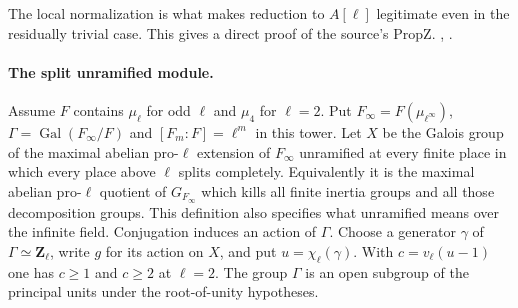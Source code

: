 The local normalization is what makes reduction to \(A[\ell]\)
legitimate even in the residually trivial case. This gives a direct
proof of the source's \(\mathrm{PropZ}\).
,
.

\paragraph{The split unramified module.}
Assume \(F\) contains \(\mu_\ell\) for odd \(\ell\) and \(\mu_4\) for
\(\ell=2\). Put \(F_\infty=F(\mu_{\ell^\infty})\),
\(\Gamma=\operatorname{Gal}(F_\infty/F)\) and \([F_m:F]=\ell^m\) in
this tower. Let \(X\) be the Galois group of the maximal abelian
pro-\(\ell\) extension of \(F_\infty\) unramified at every finite
place in which every place above \(\ell\) splits completely. Equivalently
it is the maximal abelian pro-\(\ell\) quotient of \(G_{F_\infty}\)
which kills all finite inertia groups and all those decomposition
groups. This definition also specifies what unramified means over the
infinite field. Conjugation induces an action of \(\Gamma\).
Choose a generator \(\gamma\) of \(\Gamma\simeq\mathbf Z_\ell\), write
\(g\) for its action on \(X\), and put \(u=\chi_\ell(\gamma)\).
With \(c=v_\ell(u-1)\) one has \(c\ge1\) and \(c\ge2\) at \(\ell=2\).
The group \(\Gamma\) is an open subgroup of the principal units
under the root-of-unity hypotheses.

